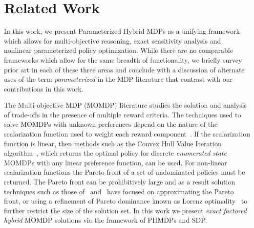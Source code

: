 \section{Related Work}
\label{sec:background}


In this work, we present Parameterized Hybrid MDPs as a unifying framework which allows for multi-objective reasoning, exact sensitivity analysis and nonlinear parameterized policy optimization. While there are no comparable frameworks which allow for the same breadth of functionality, we briefly survey prior art in each of these three areas and conclude with a discussion of alternate uses of the term \emph{parameterized} in the MDP literature that contrast with our contributions in this work.

The Multi-objective MDP (MOMDP) literature studies the solution and analysis of trade-offs in the presence of multiple reward criteria. The techniques used to solve MOMDPs with unknown preferences depend on the nature of the scalarization function used to weight each reward component~\parencite{Roijers_JAIR_2013}. If the scalarization function is linear, then methods such as the Convex Hull Value Iteration algorithm~\parencite{Barrett_ICML_2008}, which returns the optimal policy for discrete \emph{enumerated state} MOMDPs with any linear preference function, can be used. For non-linear scalarization functions the Pareto front of a set of undominated policies must be returned. The Pareto front can be prohibitively large and as a result solution techniques such as those of~\parencite{Chatterjee_STACS_2006}
and~\parencite{Pirotta_AAAI_2015} have focused on approximating the Pareto front, or using a refinement of Pareto dominance known as Lorenz optimality~\parencite{Perny_AAAI_2013} to further restrict the size of the solution set.  %
In this work we present \textit{exact} \emph{factored hybrid} MOMDP solutions via the framework of PHMDPs and SDP.

